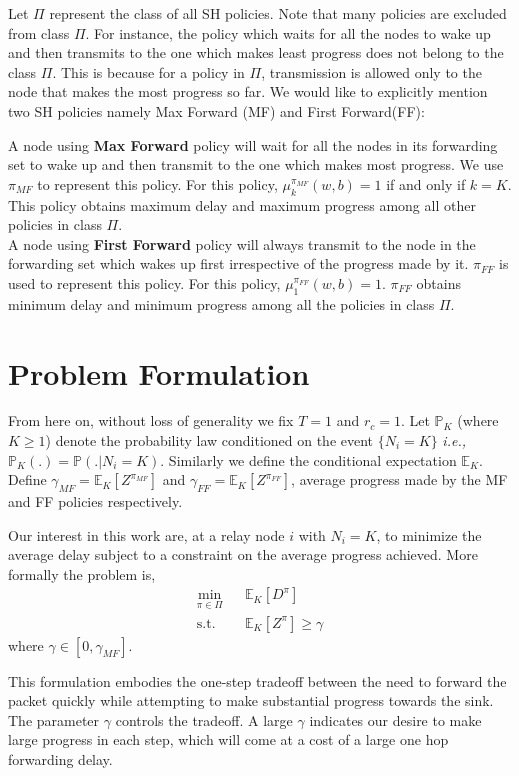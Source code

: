\documentclass[onecolumn]{IEEEtran}
\begin{document}
Let $\Pi$
 represent the class of all SH policies.
Note that many policies are excluded from class $\Pi$.
  For instance, the policy which waits for all the
  nodes to wake up and then transmits to the one which makes least
  progress does not
  belong to the class $\Pi$. This is because for a policy in $\Pi$, transmission
  is allowed only to the  node that makes the most progress so far.
 We would like to explicitly mention two SH policies namely Max Forward (MF) and First Forward(FF):

\noindent
A node using \textbf{Max Forward} policy will wait for all the  nodes in its forwarding set to wake up and then transmit to the one which makes  most progress. We use $\pi_{MF}$ to represent this policy. For this policy, $\mu_k^{\pi_{MF}}(w,b)=1$ if and only if $k=K$. This policy obtains maximum delay and maximum progress  among all other policies in class $\Pi$.\\
A node using \textbf{First Forward} policy will always transmit to the
node in the forwarding set which wakes up first irrespective of the
progress made by it. $\pi_{FF}$ is used to represent this policy. For
this policy, $\mu_1^{\pi_{FF}}(w,b)=1$. $\pi_{FF}$ obtains minimum
delay and minimum progress among all the policies in
class $\Pi$.

\section{Problem Formulation}
\label{problem_formulation}
From here on, without loss of generality we fix $T=1$ and $r_c=1$. Let
$\mathbb{P}_K$ (where $K\ge1$) denote the probability law conditioned
on the event $\{N_i=K\}$ \emph{i.e.,}
$\mathbb{P}_K(.)=\mathbb{P}(.|N_i=K)$. Similarly we define the
conditional expectation $\mathbb{E}_K$. Define
$\gamma_{MF}=\mathbb{E}_K[Z^{\pi_{MF}}]$ and
$\gamma_{FF}=\mathbb{E}_K[Z^{\pi_{FF}}]$, average progress made by the
MF and FF policies respectively.

Our interest in this work are, at a relay node $i$ with $N_i=K$, to
minimize the average delay subject to a constraint on the average
progress achieved.  More formally the problem is,
\begin{eqnarray}
\label{SH1_prob}
\min_{ {{\pi}}\in {{{\Pi}}}}&&\mathbb{E}_K[D^{{\pi}}]\\
\mbox{s.t.}&&\mathbb{E}_K[Z^{{\pi}}]\ge \gamma\nonumber
\end{eqnarray}
where $\gamma\in\left[0,\gamma_{MF}\right]$. 

This formulation embodies the one-step tradeoff between the need to
forward the packet quickly while attempting to make substantial
progress towards the sink. The parameter $\gamma$ controls the
tradeoff. A large $\gamma$ indicates our desire to make large progress
in each step, which will come at a cost of a large one hop forwarding
delay.
\end{document}
